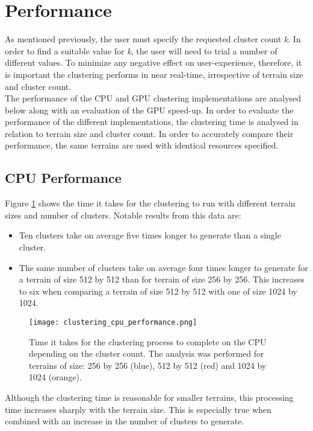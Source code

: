 \section{Performance}

As mentioned previously, the user must specify the requested cluster count \textit{k}. In order to find a suitable value for \textit{k}, the user will need to trial a number of different values. To minimize any negative effect on user-experience, therefore, it is important the clustering performs in near real-time, irrespective of terrain size and cluster count.\\

The performance of the CPU and GPU clustering implementations are analysed below along with an evaluation of the GPU speed-up. In order to evaluate the performance of the different implementations, the clustering time is analysed in relation to terrain size and cluster count. In order to accurately compare their performance, the same terrains are used with identical resources specified. 

\subsection{CPU Performance}

Figure \ref{fig:cpu_clustering_performance} shows the time it takes for the clustering to run with different terrain sizes and number of clusters. Notable results from this data are:
\begin{itemize}
\item Ten clusters take on average five times longer to generate than a single cluster.
\item The same number of clusters take on average four times longer to generate for a terrain of size 512 by 512 than for terrain of size 256 by 256. This increases to six when comparing a terrain of size 512 by 512 with one of size 1024 by 1024.
\end{itemize}

\begin{figure}
\center
	\texttt{[image: clustering\_cpu\_performance.png]}
	\caption{ Time it takes for the clustering process to complete on the CPU depending on the cluster count. The analysis was performed for terrains of size: 256 by 256 (blue), 512 by 512 (red) and 1024 by 1024 (orange).}	
	\label{fig:cpu_clustering_performance}
\end{figure}

Although the clustering time is reasonable for smaller terrains, this processing time increases sharply with the terrain size. This is especially true when combined with an increase in the number of clusters to generate. 

